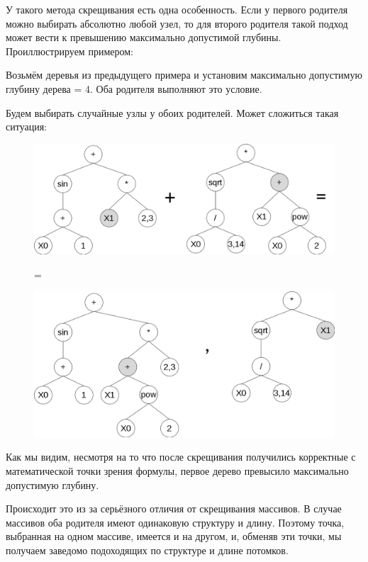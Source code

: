 У такого метода скрещивания есть одна особенность. Если у первого родителя можно выбирать абсолютно любой узел, то для второго родителя такой подход может вести к превышению максимально допустимой глубины. Проиллюстрируем примером:

Возьмём деревья из предыдущего примера и установим максимально допустимую глубину дерева = 4. Оба родителя выполняют это условие. 

Будем выбирать случайные узлы у обоих родителей. Может сложиться такая ситуация:

\clearpage
\begin{figure}[!h]
\centering
\includegraphics[scale=0.5]{research/pics/4.png}

=

\includegraphics[scale=0.5]{research/pics/5.png}
\label{figure:crossoverOverflow}
\end{figure}

Как мы видим, несмотря на то что после скрещивания получились корректные с математической точки зрения формулы, первое дерево превысило максимально допустимую глубину.

Происходит это из за серьёзного отличия от скрещивания массивов. В случае массивов  оба родителя имеют одинаковую структуру и длину. Поэтому точка, выбранная на одном массиве, имеется и на другом, и, обменяв эти точки, мы получаем заведомо подоходящих по структуре и длине потомков. 

